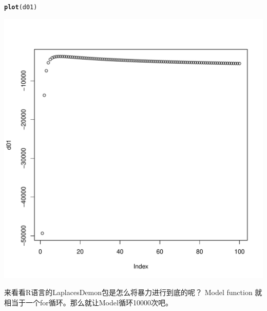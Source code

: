 \documentclass{article}\usepackage[]{graphicx}\usepackage[]{color}
\makeatletter
\def\maxwidth{ %
  \ifdim\Gin@nat@width>\linewidth
    \linewidth
  \else
    \Gin@nat@width
  \fi
}
\newcommand{\hlstd}[1]{\textcolor[rgb]{0.345,0.345,0.345}{#1}}%
\newcommand{\hlkwd}[1]{\textcolor[rgb]{0.737,0.353,0.396}{\textbf{#1}}}%
\newenvironment{kframe}{%
 \def\at@end@of@kframe{}%
 \ifinner\ifhmode%
  \def\at@end@of@kframe{\end{minipage}}%
  \begin{minipage}{\columnwidth}%
 \fi\fi%
 \def\FrameCommand##1{\hskip\@totalleftmargin \hskip-\fboxsep
 \colorbox{shadecolor}{##1}\hskip-\fboxsep
     \hskip-\linewidth \hskip-\@totalleftmargin \hskip\columnwidth}%
 \MakeFramed {\advance\hsize-\width
   \@totalleftmargin\z@ \linewidth\hsize
   \@setminipage}}%
 {\par\unskip\endMakeFramed%
 \at@end@of@kframe}
\newenvironment{knitrout}{}{} %
\makeatother
\begin{document}
\begin{knitrout}
\begin{kframe}\begin{alltt}
\hlkwd{plot}\hlstd{(d01)}
\end{alltt}
\end{kframe}
\includegraphics[width=\maxwidth]{figure/unnamed-chunk-32} 

\end{knitrout}


来看看R语言的LaplacesDemon包是怎么将暴力进行到底的呢？
Model function 就相当于一个for循环。那么就让Model循环10000次吧。
\end{document}
